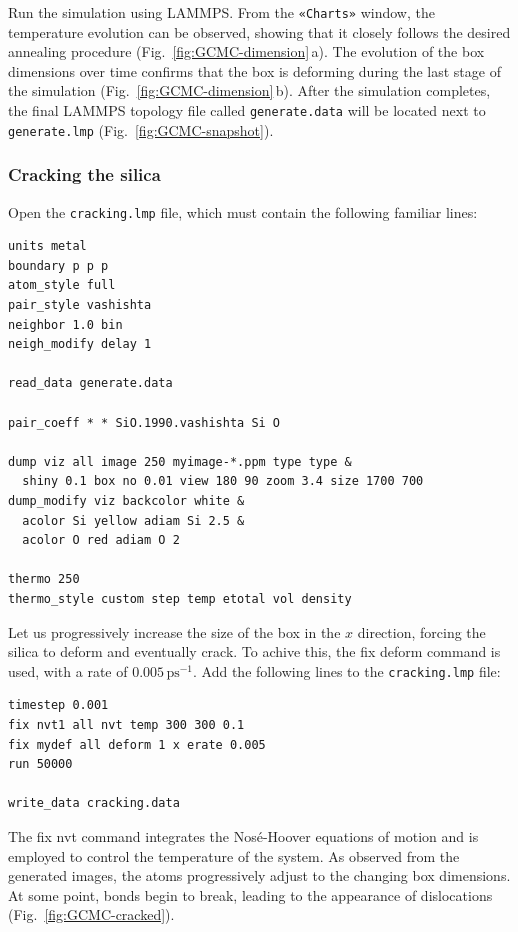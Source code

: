 \documentclass[9pt,tutorial]{livecoms}
\newcommand{\lmpcmd}[1]{\hspace{0pt}\colorbox{listing}{\textcolor{command}{\small{#1}}}\hspace{0pt}} %
\newcommand{\flecmd}[1]{\textcolor{command}{\texttt{#1}}} %
\newcommand{\guicmd}[1]{\textcolor{command}{\texttt{«#1»}}} %
\begin{document}
Run the simulation using LAMMPS.  From the \guicmd{Charts} window, the temperature
evolution can be observed, showing that it closely follows the desired annealing procedure (Fig.~\ref{fig:GCMC-dimension}\,a).
The evolution of the box dimensions over time confirms that the box
{\color{blue}is deforming} during the last stage of the simulation
(Fig.~\ref{fig:GCMC-dimension}\,b).  After the simulation completes, the final
LAMMPS topology file called \flecmd{generate.data}
will be located next to \flecmd{generate.lmp} (Fig.~\ref{fig:GCMC-snapshot}).

\subsubsection{Cracking the silica}

Open the \flecmd{cracking.lmp} file, which must contain the following familiar lines:
\begin{lstlisting}
units metal
boundary p p p
atom_style full
pair_style vashishta
neighbor 1.0 bin
neigh_modify delay 1

read_data generate.data

pair_coeff * * SiO.1990.vashishta Si O

dump viz all image 250 myimage-*.ppm type type &
  shiny 0.1 box no 0.01 view 180 90 zoom 3.4 size 1700 700
dump_modify viz backcolor white &
  acolor Si yellow adiam Si 2.5 &
  acolor O red adiam O 2

thermo 250
thermo_style custom step temp etotal vol density
\end{lstlisting}

Let us progressively increase the size of the box in the $x$ direction,
forcing the silica to deform and eventually crack.  To achive this,
the \lmpcmd{fix deform} command is used, with a rate
of $0.005\,\text{ps}^{-1}$.  Add the following lines to
the \flecmd{cracking.lmp} file:
\begin{lstlisting}
timestep 0.001
fix nvt1 all nvt temp 300 300 0.1
fix mydef all deform 1 x erate 0.005
run 50000

write_data cracking.data
\end{lstlisting}
{\color{blue}The \lmpcmd{fix nvt} command integrates the Nosé-Hoover equations
of motion and is employed to control the temperature of the system.}
As observed from the generated images, the atoms
progressively adjust to the changing box dimensions.  At some point,
bonds begin to break, leading to the appearance of
dislocations (Fig.~\ref{fig:GCMC-cracked}).
\end{document}
